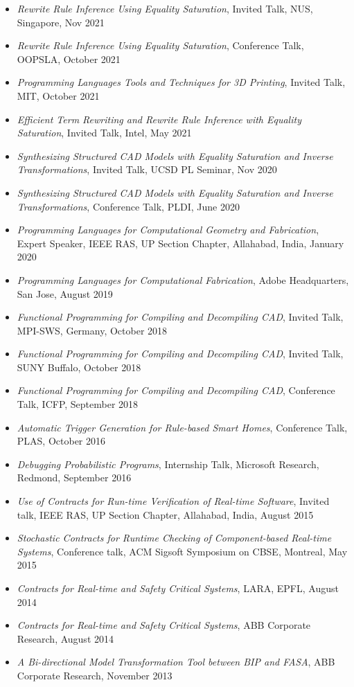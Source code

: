 \documentclass[margin, 10pt]{res} %
\begin{document}
\begin{resume}
\begin{itemize}[itemsep=.7pt]
 \item {\sl Rewrite Rule Inference Using Equality Saturation}, Invited Talk, NUS, Singapore, Nov 2021
 \item {\sl Rewrite Rule Inference Using Equality Saturation}, Conference Talk, OOPSLA, October 2021
 \item {\sl Programming Languages Tools and Techniques for 3D Printing}, Invited Talk, MIT, October 2021
 \item {\sl Efficient Term Rewriting and Rewrite Rule Inference with Equality Saturation}, Invited Talk, Intel, May 2021
 \item {\sl Synthesizing Structured CAD Models with Equality Saturation and Inverse Transformations}, Invited Talk, UCSD PL Seminar, Nov 2020
 \item {\sl Synthesizing Structured CAD Models with Equality Saturation and Inverse Transformations}, Conference Talk, PLDI, June 2020
 \item {\sl Programming Languages for Computational Geometry and Fabrication}, Expert Speaker, IEEE RAS, UP Section Chapter, Allahabad, India, January 2020
 \item {\sl Programming Languages for Computational Fabrication}, Adobe Headquarters, San Jose, August 2019
 \item {\sl Functional Programming for Compiling and Decompiling CAD}, Invited Talk, MPI-SWS, Germany, October 2018
 \item {\sl Functional Programming for Compiling and Decompiling CAD}, Invited Talk, SUNY Buffalo, October 2018
 \item {\sl Functional Programming for Compiling and Decompiling CAD}, Conference  Talk, ICFP, September 2018
 \item {\sl Automatic Trigger Generation for Rule-based Smart Homes}, Conference Talk, PLAS, October 2016
 \item {\sl Debugging Probabilistic Programs}, Internship Talk, Microsoft Research, Redmond, September 2016
 \item {\sl Use of Contracts for Run-time Verification of Real-time Software}, Invited talk, IEEE RAS, UP Section Chapter, Allahabad, India, August 2015
 \item {\sl Stochastic Contracts for Runtime Checking of Component-based Real-time Systems}, Conference talk, ACM Sigsoft Symposium on CBSE, Montreal, May 2015
 \item {\sl Contracts for Real-time and Safety Critical Systems}, LARA, EPFL, August 2014
 \item {\sl Contracts for Real-time and Safety Critical Systems}, ABB Corporate Research, August 2014
 \item {\sl A Bi-directional Model Transformation Tool between BIP and FASA}, ABB Corporate Research, November 2013
 \end{itemize}


\end{resume}
\end{document}
